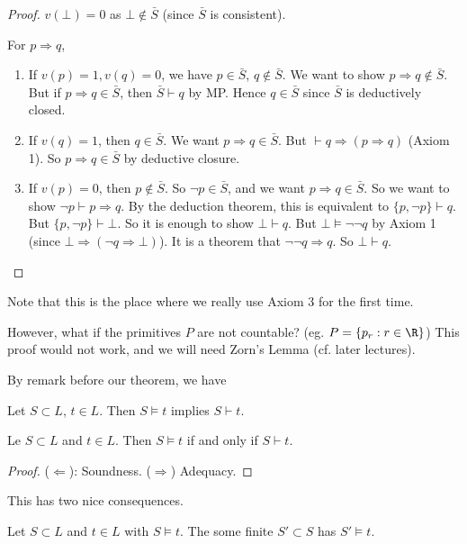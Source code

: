 \documentclass[a4paper]{article}
\begin{document}
\begin{proof}
  $v(\bot) = 0$ as $\bot \not\in \bar S$ (since $\bar S$ is consistent).

  For $p\Rightarrow q$,
  \begin{enumerate}
    \item If $v(p) = 1, v(q) = 0$, we have $p\in \bar S$, $q\not\in \bar S$. We want to show $p\Rightarrow q\not\in \bar S$. But if $p\Rightarrow q\in \bar S$, then $\bar S \vdash q$ by MP. Hence $q\in \bar S$ since $\bar S$ is deductively closed.
    \item If $v(q) = 1$, then $q\in \bar S$. We want $p\Rightarrow q\in \bar S$. But $\vdash q\Rightarrow (p\Rightarrow q)$ (Axiom 1). So $p\Rightarrow q \in \bar S$ by deductive closure.
    \item If $v(p) = 0$, then $p\not\in \bar S$. So $\neg p\in \bar S$, and we want $p\Rightarrow q\in \bar S$. So we want to show $\neg p\vdash p\Rightarrow q$. By the deduction theorem, this is equivalent to $\{p, \neg p\} \vdash q$. But $\{p, \neg p\}\vdash \bot$. So it is enough to show $\bot \vdash q$. But $\bot \models \neg \neg q$ by Axiom 1 (since $\bot \Rightarrow (\neg q\Rightarrow \bot)$). It is a theorem that $\neg \neg q\Rightarrow q$. So $\bot \vdash q$. 
  \end{enumerate}
\end{proof}
Note that this is the place where we really use Axiom 3 for the first time.

However, what if the primitives $P$ are not countable? (eg. $P = \{p_r: r\in \R\}$) This proof would not work, and we will need Zorn's Lemma (cf. later lectures).

By remark before our theorem, we have
\begin{cor}
  Let $S\subset L$, $t\in L$. Then $S\models t$ implies $S\vdash t$. 
\end{cor}

\begin{thm}
  Le $S\subset L$ and $t\in L$. Then $S\models t$ if and only if $S\vdash t$.
\end{thm}

\begin{proof}
  ($\Leftarrow$): Soundness. ($\Rightarrow $) Adequacy.
\end{proof}

This has two nice consequences.
\begin{cor}
  Let $S\subset L$ and $t\in L$ with $S\models t$. The some finite $S'\subset S$ has $S'\models t$.
\end{cor}
\end{document}
